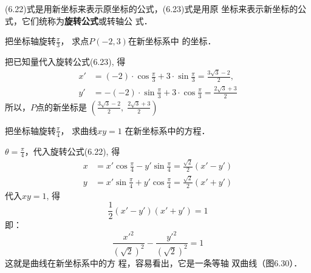 (6.22)式是用新坐标来表示原坐标的公式，(6.23)式是用原
坐标来表示新坐标的公式，它们统称为\textbf{旋转公式}或转轴公
式．

\begin{example}
    把坐标轴旋转$\frac{\pi}{3}$，
求点$P(-2,3)$在新坐标系中
的坐标．
\end{example}

\begin{solution}
把已知量代入旋转公式(6.23), 得
\[\begin{split}
x'&=(-2)\cdot \cos\frac{\pi}{3}+3\cdot \sin\frac{\pi}{3}=\frac{3\sqrt{3}-2}{2},\\
y'&=-(-2)\cdot\sin\frac{\pi}{3}+3\cdot \cos\frac{\pi}{3}=\frac{2\sqrt{3}+3}{2}
\end{split}\]
所以，$P$点的新坐标是
$\left(\frac{3\sqrt{3}-2}{2}, \; \frac{2\sqrt{3}+3}{2}\right)$
\end{solution}

\begin{example}
    把坐标轴旋转$\frac{\pi}{4}$，
求曲线$xy=1$
在新坐标系中的方程．
\end{example}


\begin{solution}
    $\theta=\frac{\pi}{4}$，代入旋转公式(6.22), 得
\[\begin{split}
    x&=x'\cos\frac{\pi}{4}-y'\sin \frac{\pi}{4}=\frac{\sqrt{2}}{2}(x'-y')\\
    y&=x'\sin\frac{\pi}{4}+y'\cos\frac{\pi}{4}=\frac{\sqrt{2}}{2}(x'+y')
\end{split}\]
代入$xy=1$, 得
\[\frac{1}{2}(x'-y')(x'+y')=1\]
即：
\[\frac{{x'}^2}{\left(\sqrt{2}\right)^2}-\frac{{y'}^2}{\left(\sqrt{2}\right)^2}=1\]
这就是曲线在新坐标系中的方
程，容易看出，它是一条等轴
双曲线（图6.30）．
\end{solution}

\begin{figure}[htp]
    \centering
    \caption{}
\end{figure}

